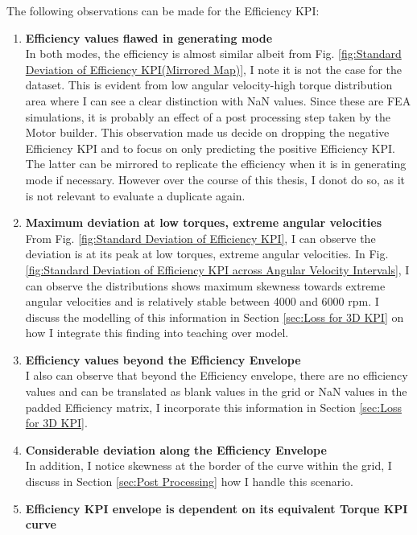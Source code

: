 \documentclass{report} %
\begin{document}
The following observations can be made for the Efficiency \ac{KPI}:
\begin{enumerate}[nosep]
    \item \textbf{Efficiency values flawed in generating mode}\\
    In both modes, the efficiency is almost similar albeit from Fig. \ref{fig:Standard Deviation of Efficiency KPI(Mirrored Map)}, I note it is not the case for the dataset. 
    This is evident from low angular velocity-high torque distribution area where I can see a clear distinction with \ac{NaN} values.
    Since these are \ac{FEA} simulations, it is probably an effect of a post processing step taken by the Motor builder.
    This observation made us decide on dropping the negative Efficiency \ac{KPI} and to focus on only predicting the positive Efficiency \ac{KPI}.\\
    The latter can be mirrored to replicate the efficiency when it is in generating mode if necessary.
    However over the course of this thesis, I donot do so, as it is not relevant to evaluate a duplicate again.
    \item \textbf{Maximum deviation at low torques, extreme angular velocities}\\
    From Fig. \ref{fig:Standard Deviation of Efficiency KPI}, I can observe the deviation is at its peak at low torques, extreme angular velocities. 
    In Fig. \ref{fig:Standard Deviation of Efficiency KPI across Angular Velocity Intervals}, I can observe the distributions shows maximum skewness towards 
    extreme angular velocities and is relatively stable between 4000 and 6000 rpm. 
    I discuss the modelling of this information in Section \ref{sec:Loss for 3D KPI} on how I integrate this finding into teaching over model. 
    \item \textbf{Efficiency values beyond the Efficiency Envelope}\\
    I also can observe that beyond the Efficiency envelope, there are no efficiency values and can be translated as blank values in the grid or \ac{NaN} values 
    in the padded Efficiency matrix, I incorporate this information in Section \ref{sec:Loss for 3D KPI}.
    \item \textbf{Considerable deviation along the Efficiency Envelope}\\
    In addition, I notice skewness at the border of the curve within the grid, I discuss in Section \ref{sec:Post Processing} how I handle this scenario.
    \item \textbf{Efficiency \ac{KPI} envelope is dependent on its equivalent Torque \ac{KPI} curve}\\

\end{enumerate}
\end{document}
